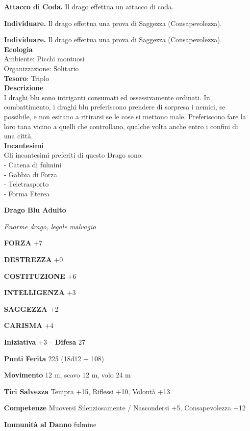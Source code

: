 \begin{multicols}{2}
	\textbf{Attacco di Coda.} Il drago effettua un attacco di coda.

	\textbf{Individuare.} Il drago effettua una prova di Saggezza (Consapevolezza).

	\textbf{Individuare.} Il drago effettua una prova di Saggezza (Consapevolezza).\\
	\textbf{Ecologia}\\
	Ambiente: Picchi montuosi\\
	Organizzazione: Solitario\\
	\textbf{Tesoro}: Triplo\\
	\textbf{Descrizione}\\
	I draghi blu sono intriganti consumati ed ossessivamente ordinati. In combattimento, i draghi blu preferiscono prendere di sorpresa i nemici, se possibile, e non esitano a ritirarsi se le cose si mettono male. Preferiscono fare la loro tana vicino a quelli che controllano, qualche volta anche entro i confini di una città.\\
	\textbf{Incantesimi}\\
	Gli incantesimi preferiti di questo Drago sono:\\
	- Catena di fulmini\\
	- Gabbia di Forza\\
	- Teletrasporto\\
	- Forma Eterea


	\medskip{}\textbf{Drago Blu Adulto}

	\textit{Enorme drago, legale malvagio}

	\textbf{FORZA} +7

	\textbf{DESTREZZA} +0

	\textbf{COSTITUZIONE} +6

	\textbf{INTELLIGENZA} +3

	\textbf{SAGGEZZA} +2

	\textbf{CARISMA} +4

	\textbf{Iniziativa} +3 -- \textbf{Difesa} 27

	\textbf{Punti Ferita} 225 (18d12 + 108)

	\textbf{Movimento} 12 m, scavo 12 m, volo 24 m

	\textbf{Tiri Salvezza} Tempra +15, Riflessi +10, Volontà +13

	\textbf{Competenze} Muoversi Silenziosamente / Nascondersi +5, Consapevolezza +12

	\textbf{Immunità al Danno} fulmine


\end{multicols}
